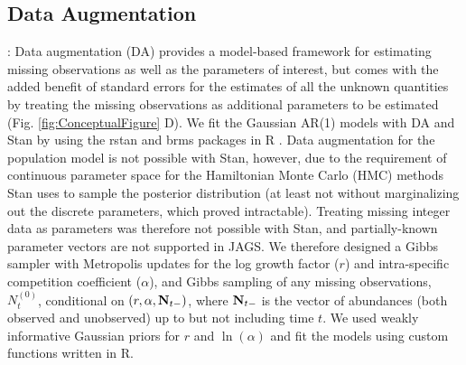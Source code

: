 \subsection{Data Augmentation}: Data augmentation (DA) provides a model-based framework for estimating missing observations as well as the parameters of interest, but comes with the added benefit of standard errors for the estimates of all the unknown quantities by treating the missing observations as additional parameters to be estimated (Fig. \ref{fig:ConceptualFigure} D). We fit the Gaussian AR(1) models with DA and Stan \citep{carpenter_stan_2017} by using the rstan \citep{rstan_package} and brms \citep{burkner2017brms} packages in R \citep{r_2021}. Data augmentation for the population model is not possible with Stan, however, due to the requirement of continuous parameter space for the Hamiltonian Monte Carlo (HMC) methods Stan uses to sample the posterior distribution (at least not without marginalizing out the discrete parameters, which proved intractable). Treating missing integer data as parameters was therefore not possible with Stan, and partially-known parameter vectors are not supported in JAGS. We therefore designed a Gibbs sampler with Metropolis updates for the log growth factor ($r$) and intra-specific competition coefficient ($\alpha$), and Gibbs sampling of any missing observations, $N_{t}^{(0)}$, conditional on $(r, \alpha, {\bf N}_{t-})$, where ${\bf N}_{t-}$ is the vector of abundances (both observed and unobserved) up to but not including time $t$. We used weakly informative Gaussian priors for $r$ and $\ln(\alpha)$ and fit the models using custom functions written in R. 


